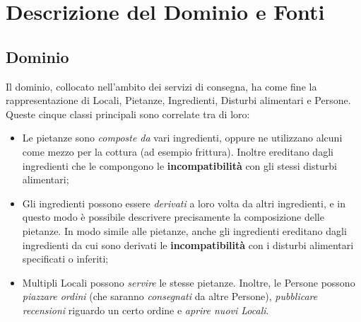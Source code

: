 \documentclass[12pt]{article}
\begin{document}
\section{Descrizione del Dominio e Fonti}
\subsection{Dominio}
Il dominio, collocato nell'ambito dei servizi di consegna, ha come fine la rappresentazione di Locali, Pietanze, Ingredienti, Disturbi alimentari e Persone.\newline
Queste cinque classi principali sono correlate tra di loro:
\begin{itemize}
    \item Le pietanze sono \textit{composte da} vari ingredienti, oppure ne utilizzano alcuni come mezzo per la cottura (ad esempio frittura). Inoltre ereditano dagli ingredienti che le compongono le \textbf{incompatibilità} con gli stessi disturbi alimentari;
    \item Gli ingredienti possono essere \textit{derivati} a loro volta da altri ingredienti, e in questo modo è possibile descrivere precisamente la composizione delle pietanze. In modo simile alle pietanze, anche gli ingredienti ereditano dagli ingredienti da cui sono derivati le \textbf{incompatibilità} con i disturbi alimentari specificati o inferiti;
    \item Multipli Locali possono \textit{servire} le stesse pietanze. Inoltre, le Persone possono \textit{piazzare ordini} (che saranno \textit{consegnati} da altre Persone), \textit{pubblicare recensioni} riguardo un certo ordine e \textit{aprire nuovi Locali}.
\end{itemize}
\end{document}
